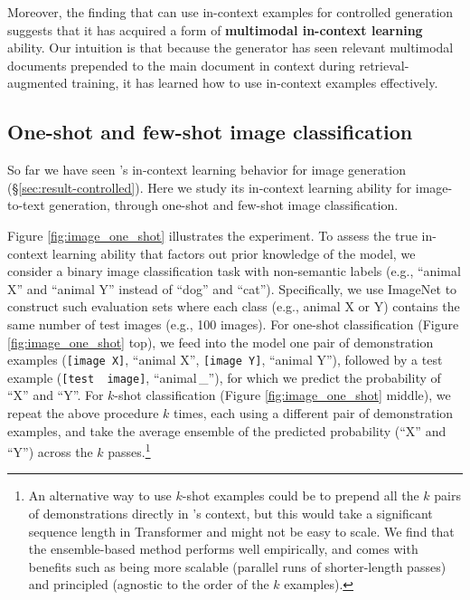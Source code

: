 Moreover, the finding that \methodname can use in-context examples for controlled generation suggests that it has acquired a form of \textbf{multimodal in-context learning} ability. Our intuition is that because the \methodname generator has seen relevant multimodal documents prepended to the main document in context during retrieval-augmented training, it has learned how to use in-context examples effectively.



\subsection{One-shot and few-shot image classification}
\label{sec:result-oneshot}
So far we have seen \methodname's in-context learning behavior for image generation (\S \ref{sec:result-controlled}). Here we study its in-context learning ability for image-to-text generation, through one-shot and few-shot image classification.

Figure \ref{fig:image_one_shot} illustrates the experiment.
To assess the true in-context learning ability that factors out prior knowledge of the model, we consider a binary image classification task with non-semantic labels (e.g., ``animal X'' and ``animal Y'' instead of ``dog'' and ``cat''). Specifically, we use ImageNet \cite{deng2009imagenet} to construct such evaluation sets where each class (e.g., animal X or Y) contains the same number of test images (e.g., 100 images).
For one-shot classification (Figure \ref{fig:image_one_shot} top), we feed into the model one pair of demonstration examples (\texttt{[image\,X]}, ``animal X'', \texttt{[image\,Y]}, ``animal Y''), followed by a test example (\texttt{[test\,\,image]}, ``animal\,\_''), for which we predict the probability of ``X'' and ``Y''. 
For $k$-shot classification (Figure \ref{fig:image_one_shot} middle), we repeat the above procedure $k$ times, each using a different pair of demonstration examples, and take the average ensemble of the predicted probability (``X'' and ``Y'') across the $k$ passes.\footnote{An alternative way to use $k$-shot examples could be to prepend all the $k$ pairs of demonstrations directly in \methodname's context, but this would take a significant sequence length in Transformer and might not be easy to scale. 
We find that the ensemble-based method performs well empirically, and comes with benefits such as being more scalable (parallel runs of shorter-length passes) and principled (agnostic to the order of the $k$ examples).}

